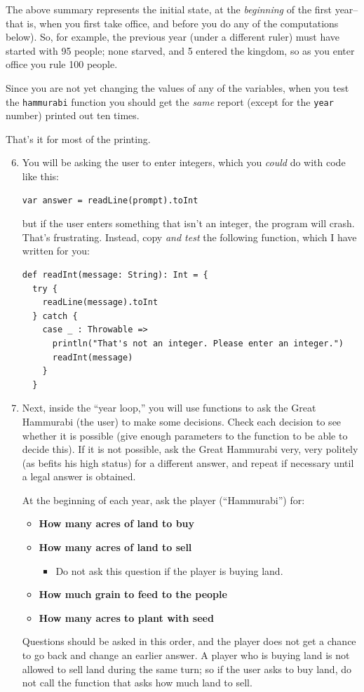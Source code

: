 \documentclass[12pt,a4paper,times]{article}
\begin{document}
\begin{enumerate}
  The above summary represents the initial
  state, at the \emph{beginning} of the first year--that is, when you
  first take office, and before you do any of the computations below).
  So, for example, the previous year (under a different ruler) must have
  started with 95 people; none starved, and 5 entered the kingdom, so as
  you enter office you rule 100 people.
  
  Since you are not yet changing the values of any of the variables, when you test the
  \texttt{hammurabi} function you should get the \emph{same} report
  (except for the \texttt{year} number) printed out ten times.
\end{enumerate}
That's it for most of the printing.
\begin{enumerate}
\setcounter{enumi}{5}
\item
  You will be asking the user to enter integers, which you \emph{could}
  do with code like this:
\begin{Verbatim}
var answer = readLine(prompt).toInt
\end{Verbatim}
but if the user enters something that isn't an integer, the program
  will crash. That's frustrating. Instead, copy \emph{and test} the
  following function, which I have written for you:
\begin{Verbatim}
def readInt(message: String): Int = {
  try {
    readLine(message).toInt
  } catch {
    case _ : Throwable =>
      println("That's not an integer. Please enter an integer.")
      readInt(message)
    }
  }    
\end{Verbatim}
\item
  Next, inside the ``year loop,'' you will use functions to ask the
  Great Hammurabi (the user) to make some decisions. Check each decision
  to see whether it is possible (give enough parameters to the function
  to be able to decide this). If it is not possible, ask the Great
  Hammurabi very, very politely (as befits his high status) for a
  different answer, and repeat if necessary until a legal answer is
  obtained.
  
  At the beginning of each year, ask the player (``Hammurabi'') for:
  \begin{itemize}
  \item
    \textbf{How many acres of land to buy}
  \item
    \textbf{How many acres of land to sell}

    \begin{itemize}
    \item
      Do not ask this question if the player is buying land.
    \end{itemize}
  \item
    \textbf{How much grain to feed to the people}
  \item
    \textbf{How many acres to plant with seed}
  \end{itemize}
  Questions should be asked in this order, and the player does not get a
  chance to go back and change an earlier answer. A player who is buying
  land is not allowed to sell land during the same turn; so if the user
  asks to buy land, do not call the function that asks how much land to
  sell.


\end{enumerate}
\end{document}
